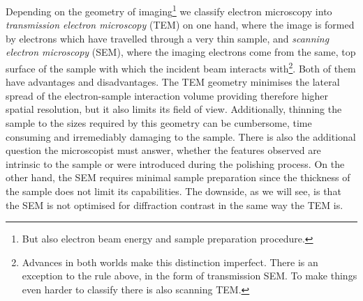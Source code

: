 Depending on the geometry of imaging\footnote{ But also electron beam energy and sample preparation procedure.} we classify electron microscopy into \textit{transmission electron microscopy} (TEM) on one hand, where the image is formed by electrons which have travelled through a very thin sample, and \textit{scanning electron microscopy} (SEM), where the imaging electrons come from the same, top surface of the sample with which the incident beam interacts with\footnote{ Advances in both worlds make this distinction imperfect. There is an exception to the rule above, in the form of transmission SEM. To make things even harder to classify there is also scanning TEM.}. Both of them have advantages and disadvantages. The TEM geometry minimises the lateral spread of the electron-sample interaction volume providing therefore higher spatial resolution, but it also limits its field of view. Additionally, thinning the sample to the sizes required by this geometry can be cumbersome, time consuming and irremediably damaging to the sample. There is also the additional question the microscopist must answer, whether the features observed are intrinsic to the sample or were introduced during the polishing process. On the other hand, the SEM requires minimal sample preparation since the thickness of the sample does not limit its capabilities. The downside, as we will see, is that the SEM is not optimised for diffraction contrast in the same way the TEM is. 


